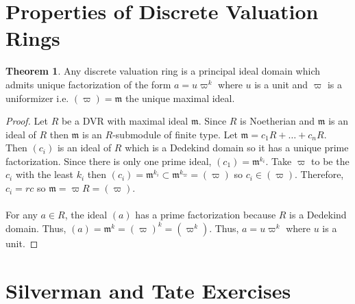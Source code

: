 \documentclass[12pt]{extarticle}
\theoremstyle{definition}
\newtheorem{theorem}{Theorem}[section]
\begin{document}
\section{Properties of Discrete Valuation Rings}

\begin{theorem}
Any discrete valuation ring is a principal ideal domain which admits unique factorization of the form $a = u \varpi^k$ where $u$ is a unit and $\varpi$ is a uniformizer i.e. $(\varpi) = \mathfrak{m}$ the unique maximal ideal. 
\end{theorem}

\begin{proof}
Let $R$ be a DVR with maximal ideal $\mathfrak{m}$. Since $R$ is Noetherian and $\mathfrak{m}$ is an ideal of $R$ then $\mathfrak{m}$ is an $R$-submodule of finite type. Let $\mathfrak{m} = c_1 R + \dots + c_n R$. Then $(c_i)$ is an ideal of $R$ which is a Dedekind domain so it has a unique prime factorization. Since there is only one prime ideal, $(c_1) = \mathfrak{m}^{k_i}$. Take $\varpi$ to be the $c_i$ with the least $k_i$ then $(c_i) = \mathfrak{m}^{k_i} \subset \mathfrak{m}^{k_\varpi} = (\varpi)$ so $c_i \in (\varpi)$. Therefore, $c_i = r c$ so $\mathfrak{m} = \varpi R = (\varpi)$. 
\\ \\
For any $a \in R$, the ideal $(a)$ has a prime factorization because $R$ is a Dedekind domain. Thus, $(a) = \mathfrak{m}^k = (\varpi)^k = (\varpi^k)$. Thus, $a = u \varpi^k$ where $u$ is a unit.
\end{proof}


\section{Silverman and Tate Exercises}
\end{document}
